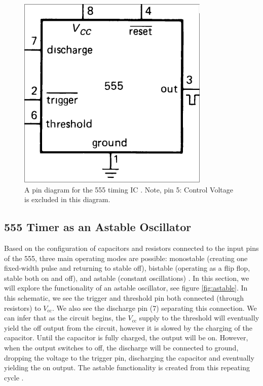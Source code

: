 \documentclass[%
 reprint,
 amsmath,amssymb,
 aps,
]{revtex4-2}
\begin{document}
\begin{figure}
    \includegraphics[width=0.7\columnwidth]{Images/555Pins.png}
    \caption{\label{fig:555}A pin diagram for the 555 timing IC \cite{horowitz}. Note, pin 5: Control Voltage is excluded in this diagram.}
\end{figure}
    
    \subsection{555 Timer as an Astable Oscillator}
    Based on the configuration of capacitors and resistors connected to the input pins of the 555, three main operating modes are possible: monostable (creating one fixed-width pulse and returning to stable off), bistable (operating as a flip flop, stable both on and off), and astable (constant oscillations) \cite{555Modes}. In this section, we will explore the functionality of an astable oscillator, see figure \ref{fig:astable}. In this schematic, we see the trigger and threshold pin both connected (through resistors) to $V_{\text{cc}}$. We also see the discharge pin (7) separating this connection. We can infer that as the circuit begins, the $V_\text{cc}$ supply to the threshold will eventually yield the off output from the circuit, however it is slowed by the charging of the capacitor. Until the capacitor is fully charged, the output will be on. However, when the output switches to off, the discharge will be connected to ground, dropping the voltage to the trigger pin, discharging the capacitor and eventually yielding the on output. The astable functionality is created from this repeating cycle \cite{555Modes}.
\end{document}
